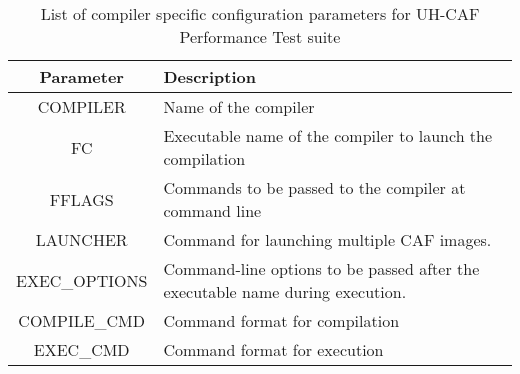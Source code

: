\begin{table}[h!]
\small
\caption{List of compiler specific configuration parameters for UH-CAF Performance Test suite }
\label{tab:params_compiler}
\begin{tabular}{|c|p{6cm}|}
\hline
Parameter & Description \\\hline
COMPILER & Name of the compiler\\\hline
FC & Executable name of the compiler to launch the compilation\\\hline
FFLAGS & Commands to be passed to the compiler at command line\\\hline
LAUNCHER & Command for launching multiple CAF images.\\\hline
EXEC\_OPTIONS & Command-line options to be passed after the executable name during execution.\\\hline
COMPILE\_CMD & Command format for compilation\\\hline
EXEC\_CMD & Command format for execution\\\hline
\end{tabular}
\end{table}
